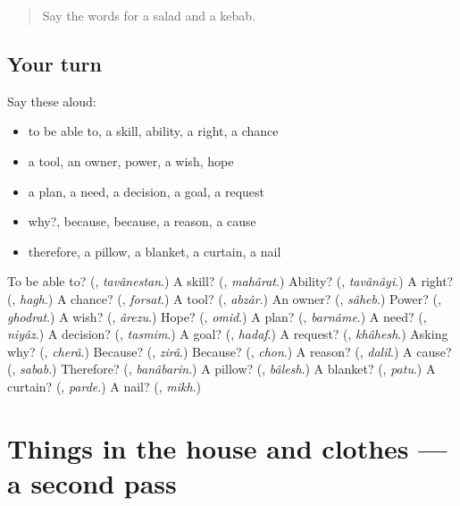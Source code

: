 \label{lesson:FA-R98-first-pass-can-want-and-why}



\begin{quote}
Say the words for a salad and a kebab.
\end{quote}

\subsection*{Your turn}
Say these aloud:

\begin{itemize}
\raggedright
  \item to be able to, a skill, ability, a right, a chance
  \item a tool, an owner, power, a wish, hope
  \item a plan, a need, a decision, a goal, a request
  \item why?, because, because, a reason, a cause
  \item therefore, a pillow, a blanket, a curtain, a nail
\end{itemize}

\begin{tcolorbox}[breakable,colback=teal!4,colframe=teal!35!black,title={Before you move on}]
To be able to? (\textbf{}, \emph{tavânestan}.) A skill? (\textbf{}, \emph{mahârat}.) Ability? (\textbf{}, \emph{tavânâyi}.) A right? (\textbf{}, \emph{hagh}.) A chance? (\textbf{}, \emph{forsat}.) A tool? (\textbf{}, \emph{abzâr}.) An owner? (\textbf{}, \emph{sâheb}.) Power? (\textbf{}, \emph{ghodrat}.) A wish? (\textbf{}, \emph{ârezu}.) Hope? (\textbf{}, \emph{omid}.) A plan? (\textbf{}, \emph{barnâme}.) A need? (\textbf{}, \emph{niyâz}.) A decision? (\textbf{}, \emph{tasmim}.) A goal? (\textbf{}, \emph{hadaf}.) A request? (\textbf{}, \emph{khâhesh}.) Asking why? (\textbf{}, \emph{cherâ}.) Because? (\textbf{}, \emph{zirâ}.) Because? (\textbf{}, \emph{chon}.) A reason? (\textbf{}, \emph{dalil}.) A cause? (\textbf{}, \emph{sabab}.) Therefore? (\textbf{}, \emph{banâbarin}.) A pillow? (\textbf{}, \emph{bâlesh}.) A blanket? (\textbf{}, \emph{patu}.) A curtain? (\textbf{}, \emph{parde}.) A nail? (\textbf{}, \emph{mikh}.)
\end{tcolorbox}
\section[(dialogue)]{Things in the house and clothes — a second pass}

